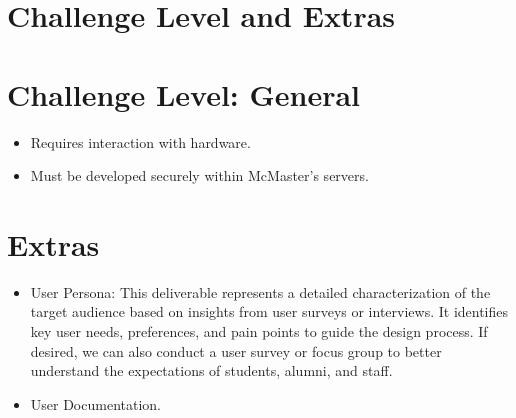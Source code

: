 \documentclass{article}
\begin{document}
\section{Challenge Level and Extras}



\section*{Challenge Level: General}

\begin{itemize}
    \item Requires interaction with hardware.
    \item Must be developed securely within McMaster’s servers.
\end{itemize}

\section*{Extras}

\begin{itemize}
    \item User Persona: This deliverable represents a detailed characterization of the target audience based on insights from user surveys or interviews. It identifies key user needs, preferences, and pain points to guide the design process. If desired, we can also conduct a user survey or focus group to better understand the expectations of students, alumni, and staff.
    \item User Documentation.
\end{itemize}
\end{document}
